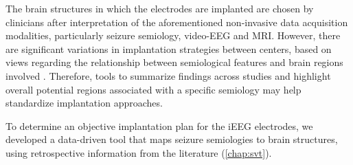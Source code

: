 The brain structures in which the electrodes are implanted are chosen by clinicians after interpretation of the aforementioned non-invasive data acquisition modalities, particularly seizure semiology, video-\ac{EEG} and \ac{MRI}.
However, there are significant variations in implantation strategies between centers, based on views regarding the relationship between semiological features and brain regions involved \cite{tufenkjian_seizure_2012}.
Therefore, tools to summarize findings across studies and highlight overall potential regions associated with a specific semiology may help standardize implantation approaches.

To determine an objective implantation plan for the \ac{iEEG} electrodes, we developed a data-driven tool that maps seizure semiologies to brain structures, using retrospective information from the literature (\cref{chap:svt}).

